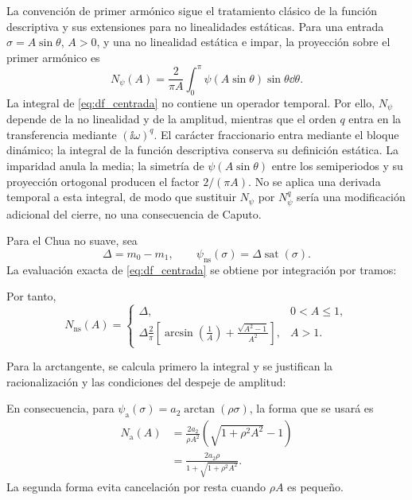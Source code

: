 La convención de primer armónico sigue el
tratamiento clásico de la función descriptiva y sus extensiones para
no linealidades estáticas\cite{GelbVanderVelde1968,Atherton1975,AthertonTanYerogluKavuranYuce2014}.
Para una entrada \(\sigma=A\sin\theta\), \(A>0\), y una no linealidad
estática e impar, la proyección sobre el primer armónico es
\begin{equation}
N_\psi(A)
=\frac{2}{\pi A}\int_0^\pi
\psi(A\sin\theta)\sin\theta\dd\theta.
\label{eq:df_centrada}
\end{equation}
La integral de \cref{eq:df_centrada} no contiene un operador temporal. Por
ello, \(N_\psi\) depende de la no linealidad y de la amplitud, mientras que el
orden \(q\) entra en la transferencia mediante
\((\ii\omega)^q\). El carácter fraccionario entra mediante el bloque dinámico;
la integral de la función descriptiva conserva su definición estática.
La imparidad anula la media; la simetría de
\(\psi(A\sin\theta)\) entre los semiperiodos y su proyección ortogonal
producen el factor \(2/(\pi A)\). No se aplica una derivada temporal a
esta integral, de modo que sustituir \(N_\psi\) por \(N_\psi^q\) sería
una modificación adicional del cierre, no una consecuencia de Caputo.

Para el Chua no suave, sea
\[
\Delta=m_0-m_1,\qquad
\psi_{\mathrm{ns}}(\sigma)=\Delta\operatorname{sat}(\sigma).
\]
La evaluación exacta de \cref{eq:df_centrada} se obtiene por integración por
tramos:
\begingroup
\def\HAFOderivationpart{6}

\endgroup
Por tanto,
\begin{equation}
N_{\mathrm{ns}}(A)=
\begin{cases}
\Delta,&0<A\leq1,\\[1mm]
\displaystyle
\Delta\frac{2}{\pi}
\left[
\arcsin\!\left(\frac1A\right)
+\frac{\sqrt{A^2-1}}{A^2}
\right],&A>1.
\end{cases}
\label{eq:df_saturacion}
\end{equation}

Para la arctangente, se calcula primero la integral y se justifican la
racionalización y las condiciones del despeje de amplitud:
\begingroup
\def\HAFOderivationpart{8}

\endgroup
En consecuencia, para
\(\psi_{\mathrm a}(\sigma)=a_2\arctan(\rho\sigma)\), la forma que se usará es
\begin{equation}
\begin{aligned}
N_{\mathrm a}(A)
&=\frac{2a_2}{\rho A^2}
\left(\sqrt{1+\rho^2A^2}-1\right)\\
&=\frac{2a_2\rho}
{1+\sqrt{1+\rho^2A^2}}.
\end{aligned}
\label{eq:df_arctan}
\end{equation}
La segunda forma evita cancelación por resta cuando \(\rho A\) es pequeño.

